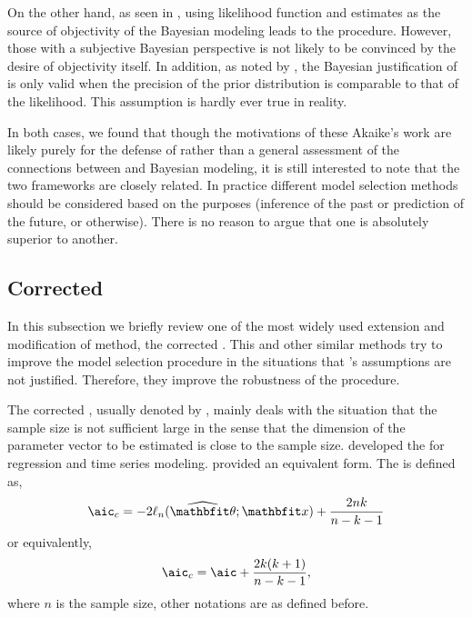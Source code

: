 On the other hand, as seen in \textcite{Akaike1980}, using likelihood function
and \aic estimates as the source of objectivity of the Bayesian modeling leads
to the \bic procedure. However, those with a subjective Bayesian perspective
is not likely to be convinced by the desire of objectivity itself. In
addition, as noted by \textcite{Kass1995}, the Bayesian justification of \aic
is only valid when the precision of the prior distribution is comparable to
that of the likelihood. This assumption is hardly ever true in reality.

In both cases, we found that though the motivations of these Akaike's work are
likely purely for the defense of \aic rather than a general assessment of the
connections between \aic and Bayesian modeling, it is still interested to note
that the two frameworks are closely related. In practice different model
selection methods should be considered based on the purposes (inference of the
past or prediction of the future, or otherwise). There is no reason to argue
that one is absolutely superior to another.

\firstyear
\subsection{Corrected \protect\aic}
\label{sub:Corrected aic}

In this subsection we briefly review one of the most widely used extension and
modification of \aic method, the corrected \aic. This and other similar
methods try to improve the model selection procedure in the situations that
\textcite{Akaike1973}'s assumptions are not justified. Therefore, they improve
the robustness of the \aic procedure.

The corrected \aic, usually denoted by \aicc, mainly deals with the situation
that the sample size is not sufficient large in the sense that the dimension
of the parameter vector to be estimated is close to the sample size.
\textcite{Hurvich1989} developed the \aicc for regression and time series
modeling. \textcite{Sugiura1978} provided an equivalent form. The \aicc is
defined as,
\begin{equation}
  \text{\aicc} = -2\ell_n(\hbth;\bfx) + \frac{2nk}{n-k-1}
\end{equation}
or equivalently,
\begin{equation}
  \text{\aicc} = \text{\aic} + \frac{2k(k+1)}{n-k-1},
\end{equation}
where $n$ is the sample size, other notations are as defined before.

